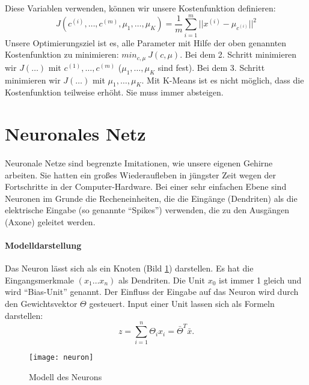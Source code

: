 Diese Variablen verwenden, k\"onnen wir unsere Kostenfunktion definieren:
\begin{equation}
J(c^{(i)},\dots,c^{(m)},\mu_1,\dots,\mu_K) = \frac{1}{m}\sum_{i=1}^m ||x^{(i)} - \mu_{c^{(i)}}||^2
\end{equation}
Unsere Optimierungsziel ist es, alle Parameter mit Hilfe der oben genannten Kostenfunktion zu minimieren: $min_{c,\mu}\ J(c,\mu)$. Bei dem 2. Schritt minimieren wir $J(\dots)$ mit $c^{(1)},\dots,c^{(m)}$ ($\mu_1,\dots,\mu_K$ sind fest). Bei dem 3. Schritt minimieren wir $J(\dots)$ mit $\mu_1,\dots,\mu_K$. Mit K-Means ist es nicht m\"oglich, dass die Kostenfunktion teilweise erh\"oht. Sie muss immer absteigen.


\section{Neuronales Netz}

\paragraph{}
Neuronale Netze sind begrenzte Imitationen, wie unsere eigenen Gehirne arbeiten. Sie hatten ein gro\ss{}es Wiederaufleben in j\"ungster Zeit wegen der Fortschritte in der Computer-Hardware.
Bei einer sehr einfachen Ebene sind Neuronen im Grunde die Recheneinheiten, die die Eing\"ange (Dendriten) als die elektrische Eingabe (so genannte ``Spikes'') verwenden, die zu den Ausg\"angen (Axone) geleitet werden.

\paragraph{Modelldarstellung\\}
Das Neuron l\"asst sich als ein Knoten (Bild \ref{fig:neuron}) darstellen. Es hat die Eingangsmerkmale $(x_1 \dots x_n)$ als Dendriten. Die Unit $x_0$ ist immer 1 gleich und wird ``Bias-Unit'' genannt. Der Einfluss der Eingabe auf das Neuron wird durch den Gewichtsvektor $\Theta$ gesteuert. Input einer Unit lassen sich als Formeln darstellen:
\begin{equation}
z=\sum^n_{i=1}\Theta_ix_i=\bar{\Theta}^T\bar{x}.
\end{equation}

\begin{figure}[ht]
\centering
\texttt{[image: neuron]}
\caption{Modell des Neurons}
\label{fig:neuron}
\end{figure}

